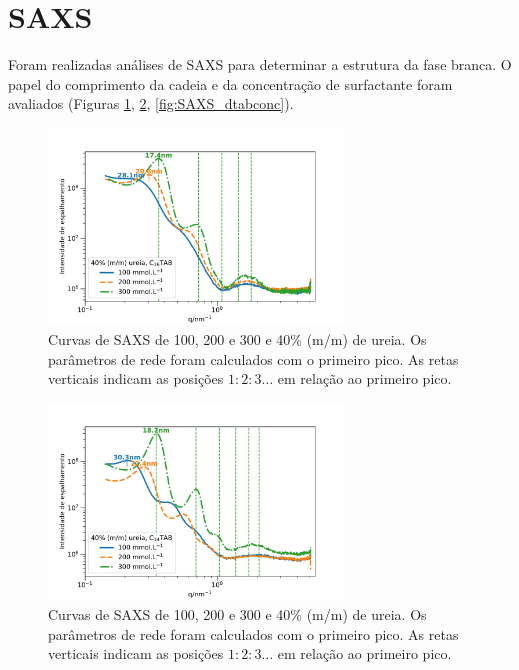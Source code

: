 	\FloatBarrier
\section{SAXS} 

	Foram realizadas análises de SAXS para determinar a estrutura da fase branca. O papel do comprimento da cadeia e da concentração de surfactante foram avaliados (Figuras \ref{fig:SAXS_ctabconc}, \ref{fig:SAXS_ttabconc}, \ref{fig:SAXS_dtabconc}).
	
	\begin{figure}[h]
		\centering
		\includegraphics[width=0.7\textwidth]{imagens/saxs/CTAB_conc}
		\caption{Curvas de SAXS de \CTAB{} 100, 200 e 300 \mM{} e 40\% (m/m) de ureia. Os parâmetros de rede foram calculados com o primeiro pico. As retas verticais indicam as posições \(1:2:3\dots\) em relação ao primeiro pico.}
		\label{fig:SAXS_ctabconc}
	\end{figure}
	
	\begin{figure}[h]
		\centering
		\includegraphics[width=0.7\textwidth]{imagens/saxs/TTAB_conc}
		\caption{Curvas de SAXS de \TTAB{} 100, 200 e 300 \mM{} e 40\% (m/m) de ureia. Os parâmetros de rede foram calculados com o primeiro pico. As retas verticais indicam as posições \(1:2:3\dots\) em relação ao primeiro pico.}
		\label{fig:SAXS_ttabconc}
	\end{figure}
	
